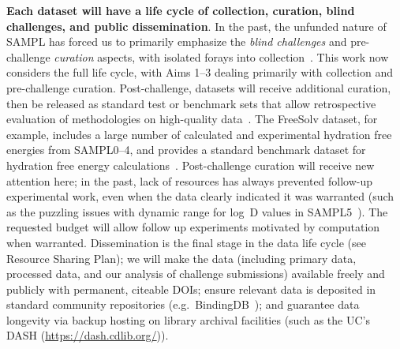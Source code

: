 \documentclass[11pt]{article}
\begin{document}
\textbf{Each dataset will have a life cycle of collection, curation, blind challenges, and public dissemination}.
In the past, the unfunded nature of SAMPL has forced us to primarily emphasize the \emph{blind challenges} and pre-challenge \emph{curation} aspects, with isolated forays into collection~\cite{rustenburg_measuring_2016, Newman:2011:JComputAidedMolDes}. 
This work now considers the full life cycle, with Aims 1--3 dealing primarily with collection and pre-challenge curation.
Post-challenge, 
datasets will receive additional curation, then be released as standard test or benchmark sets that allow retrospective evaluation of methodologies on high-quality data~\cite{mobley_predicting_2016}. 
The FreeSolv dataset, for example, includes a large number of calculated and experimental hydration free energies from SAMPL0--4, and provides a standard benchmark dataset for hydration free energy calculations~\cite{Mobley:2014:JComputAidedMolDes}.
Post-challenge curation will receive new attention here; in the past, lack of resources has always prevented follow-up experimental work, even when the data clearly indicated it was warranted (such as the puzzling issues with dynamic range for log~D values in SAMPL5~\cite{rustenburg_measuring_2016, bannan_blind_2016}).
The requested budget will allow follow up experiments motivated by computation when warranted.
Dissemination is the final stage in the data life cycle (see Resource Sharing Plan); we will make the data (including primary data, processed data, and our analysis of challenge submissions) available freely and publicly with permanent, citeable DOIs; ensure relevant data is deposited in standard community repositories (e.g.~BindingDB~\cite{Liu:2007:Nucl.AcidsRes.}); and guarantee data longevity via backup hosting on library archival facilities (such as the UC's DASH (\url{https://dash.cdlib.org/})).

\end{document}
